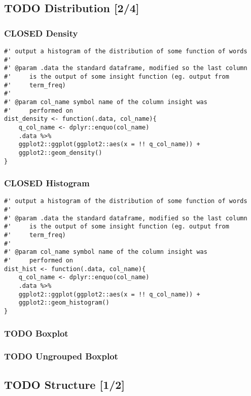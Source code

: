 \documentclass[a4paper, 11pt]{article}
\begin{document}
\subsection{{\bfseries\sffamily TODO} Distribution [2/4]}
\label{sec:org268ddc7}
\subsubsection{{\bfseries\sffamily CLOSED} Density}
\label{sec:org8ab041e}
\begin{verbatim}
#' output a histogram of the distribution of some function of words
#'
#' @param .data the standard dataframe, modified so the last column
#'     is the output of some insight function (eg. output from
#'     term_freq)
#'
#' @param col_name symbol name of the column insight was
#'     performed on
dist_density <- function(.data, col_name){
    q_col_name <- dplyr::enquo(col_name)
    .data %>%
	ggplot2::ggplot(ggplot2::aes(x = !! q_col_name)) +
	ggplot2::geom_density()
}
\end{verbatim}
\subsubsection{{\bfseries\sffamily CLOSED} Histogram}
\label{sec:org1f18e25}
\begin{verbatim}
#' output a histogram of the distribution of some function of words
#'
#' @param .data the standard dataframe, modified so the last column
#'     is the output of some insight function (eg. output from
#'     term_freq)
#'
#' @param col_name symbol name of the column insight was
#'     performed on
dist_hist <- function(.data, col_name){
    q_col_name <- dplyr::enquo(col_name)
    .data %>%
	ggplot2::ggplot(ggplot2::aes(x = !! q_col_name)) +
	ggplot2::geom_histogram()
}
\end{verbatim}
\subsubsection{{\bfseries\sffamily TODO} Boxplot}
\label{sec:org4c37518}
\subsubsection{{\bfseries\sffamily TODO} Ungrouped Boxplot}
\label{sec:orgcb94aed}
\subsection{{\bfseries\sffamily TODO} Structure [1/2]}
\label{sec:org413af92}
\end{document}
